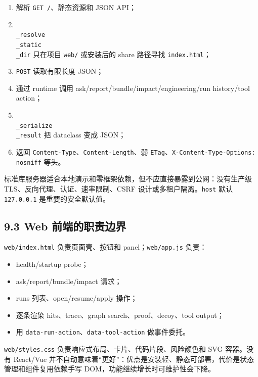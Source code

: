 \documentclass[UTF8,12pt,openany]{ctexbook}
\begin{document}
\begin{enumerate}
\item 解析 \texttt{GET /}、静态资源和 JSON API；
\item \texttt{\\_resolve\\_static\\_dir} 只在项目 \texttt{web/} 或安装后的 share 路径寻找 \texttt{index.html}；
\item \texttt{POST} 读取有限长度 JSON；
\item 通过 runtime 调用 ask/report/bundle/impact/engineering/run history/tool action；
\item \texttt{\\_serialize\\_result} 把 dataclass 变成 JSON；
\item 返回 \texttt{Content-Type}、\texttt{Content-Length}、弱 \texttt{ETag}、\texttt{X-Content-Type-Options: nosniff} 等头。
\end{enumerate}

标准库服务器适合本地演示和零框架依赖，但不应直接暴露到公网：没有生产级 TLS、反向代理、认证、速率限制、CSRF 设计或多租户隔离。\texttt{host} 默认 \texttt{127.0.0.1} 是重要的安全默认值。\par

\subsection{9.3 Web 前端的职责边界}

\texttt{web/index.html} 负责页面壳、按钮和 panel；\texttt{web/app.js} 负责：\par

\begin{itemize}
\item health/startup probe；
\item ask/report/bundle/impact 请求；
\item runs 列表、open/resume/apply 操作；
\item 逐条渲染 hits、trace、graph search、proof、decoy、tool output；
\item 用 \texttt{data-run-action}、\texttt{data-tool-action} 做事件委托。
\end{itemize}

\texttt{web/styles.css} 负责响应式布局、卡片、代码片段、风险颜色和 SVG 容器。没有 React/Vue 并不自动意味着“更好”：优点是安装轻、静态可部署，代价是状态管理和组件复用依赖手写 DOM，功能继续增长时可维护性会下降。\par
\end{document}
